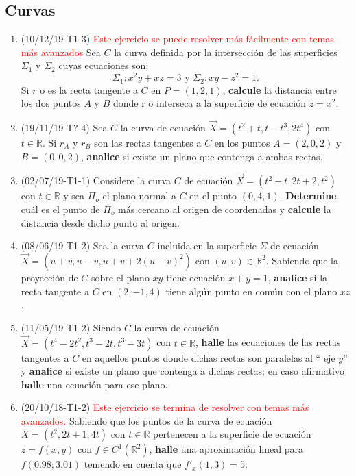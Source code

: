 \documentclass[12pt,a4paper]{article}
\renewcommand{\b}[1]{\textbf{#1}}
\newcommand{\red}[1]{\textcolor{red}{#1}}
\newcommand{\R}{\mathbb{R}}
\begin{document}
\subsection{Curvas}
\begin{enumerate}
	\item (10/12/19-T1-3) \red{Este ejercicio se puede resolver más fácilmente con temas más avanzados} Sea $C$ la curva definida por la intersección de las superficies $\Sigma_1$ y $\Sigma_2$ cuyas ecuaciones son:
	\[\Sigma_1 : x^2 y + x z = 3 \text{  y  } \Sigma_2 : x y - z^2 = 1.\]
	Si \(r\) o es la recta tangente a \(C\) en \(P = ( 1, 2, 1 )\), \b{calcule}  la distancia entre los dos puntos \(A\) y \(B\) donde	r o interseca a la superficie de ecuación \(z = x^2 \).
	
	\item (19/11/19-T?-4) Sea $ C $ la curva de ecuación $ \vec{X} = ( t^2 + t, t - t^3, 2 t^4 ) $ con $ t\in \R $. Si $ r_A $ y $ r_B $ son las rectas tangentes a $ C $ en los puntos $ A = ( 2, 0, 2 ) $ y $ B = ( 0, 0, 2 ) $, \b{analice} si existe un plano que contenga a ambas rectas.
	
	\item (02/07/19-T1-1) Considere la curva $ C $ de ecuación $ \vec{X} = ( t^2 - t, 2 t + 2, t^2)$ con $ t\in \R$ y sea $ \Pi_o $ el plano normal a $ C $ en el punto $ ( 0, 4, 1 )  $. \b{Determine} cuál es el punto de $ \Pi_o $ más cercano al origen de coordenadas y \b{calcule}  la distancia desde dicho punto al origen.
	
	\item (08/06/19-T1-2) Sea la curva $ C $ incluida en la superficie $ \Sigma $ de ecuación $\vec{X} = ( u + v, u - v, u + v + 2 ( u - v )^2 )$ con $( u, v ) \in\R^2  $. Sabiendo que la proyección de $ C $ sobre el plano $ xy $ tiene ecuación $ x + y = 1 $, \b{analice} si la recta tangente a $ C $ en $ ( 2, - 1, 4 ) $ tiene algún punto en común con el plano $ xz  $.
	
	\item (11/05/19-T1-2) Siendo $ C $ la curva de ecuación $ \vec{X} = ( t^4 - 2 t^2, t^3 - 2 t, t^3 - 3 t ) $ con $ t \in\R$, \b{halle} las ecuaciones de las	rectas tangentes a $ C $ en aquellos puntos donde dichas rectas son paralelas al “ eje $ y $” y \b{analice} si existe un plano que contenga a dichas rectas; en caso afirmativo \b{halle} una ecuación para ese plano.
	
	\item (20/10/18-T1-2) \red{Este ejercicio se termina de resolver con temas más avanzados.} Sabiendo que los puntos de la curva de ecuación $ X = ( t^2, 2 t + 1, 4 t ) $ con $ t\in\R $ pertenecen a la superficie de ecuación $ z = f ( x, y ) $ con $ f \in C^1 ( \R^2 )$, \b{halle} una aproximación lineal para $ f(0.98 ; 3.01)$ teniendo en cuenta que $ f'_x( 1, 3 ) = 5  $.
	

\end{enumerate}
\end{document}
